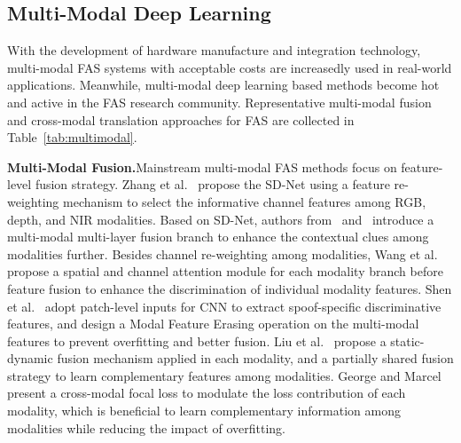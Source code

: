 \documentclass[10pt,journal,compsoc]{IEEEtran}
\begin{document}
\vspace{-0.8em}

\subsection{Multi-Modal Deep Learning}
With the development of hardware manufacture and integration technology, multi-modal FAS systems with acceptable costs are increasedly used in real-world applications. Meanwhile, multi-modal deep learning based methods become hot and active in the FAS research community. Representative multi-modal fusion and cross-modal translation approaches for FAS are collected in Table~\ref{tab:multimodal}.

\vspace{0.4em}

\noindent\textbf{Multi-Modal Fusion.}\quad Mainstream multi-modal FAS methods focus on feature-level fusion strategy. 
Zhang et al.~\cite{zhang2020casia} propose the SD-Net using a feature re-weighting mechanism to select the informative channel features among RGB, depth, and NIR modalities. Based on SD-Net, authors from~\cite{parkin2019recognizing} and~\cite{kuang2019multi} introduce a multi-modal multi-layer fusion branch to enhance the contextual clues among modalities further. Besides channel re-weighting among modalities, Wang et al.~\cite{wang2019multi} propose a spatial and channel attention module for each modality branch before feature fusion to enhance the discrimination of individual modality features. Shen et al.~\cite{shen2019facebagnet} adopt patch-level inputs for CNN to extract spoof-specific discriminative features, and design a Modal Feature Erasing operation on the multi-modal features to prevent overfitting and better fusion. Liu et al.~\cite{li2020casia} propose a static-dynamic fusion mechanism applied in each modality, and a partially shared fusion strategy to learn complementary features among modalities. George and Marcel~\cite{george2021cross} present a cross-modal focal loss to modulate the loss contribution of each modality, which is beneficial to learn complementary information among modalities while reducing the impact of overfitting.
\end{document}
